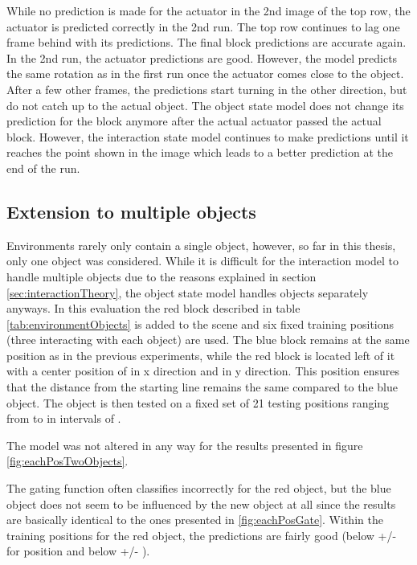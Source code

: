 While no prediction is made for the actuator in the 2nd image of the top row, the actuator is predicted correctly in the 2nd run. The top row continues to lag one frame behind with its predictions. The final block predictions are accurate again.
In the 2nd run, the actuator predictions are good. However, the model predicts the same rotation as in the first run once the actuator comes close to the object. After a few other frames, the predictions start turning in the other direction, but do not catch up to the actual object. The object state model does not change its prediction for the block anymore after the actual actuator passed the actual block. However, the interaction state model continues to make predictions until it reaches the point shown in the image which leads to a better prediction at the end of the run.

\subsection{Extension to multiple objects \label{sec:multipleObjects}}

Environments rarely only contain a single object, however, so far in this thesis, only one object was considered. While it is difficult for the interaction model to handle multiple objects due to the reasons explained in section \ref{sec:interactionTheory}, the object state model handles objects separately anyways. In this evaluation the red block described in table \ref{tab:environmentObjects} is added to the scene and six fixed training positions (three interacting with each object) are used. The blue block remains at the same position as in the previous experiments, while the red block is located left of it with a center position of  in x direction and  in y direction. This position ensures that the distance from the starting line remains the same compared to the blue object.
The object is then tested on a fixed set of 21 testing positions ranging from  to  in intervals of .


The model was not altered in any way for the results presented in figure \ref{fig:eachPosTwoObjects}.

The gating function often classifies incorrectly for the red object, but the blue object does not seem to be influenced by the new object at all since the results are basically identical to the ones presented in \ref{fig:eachPosGate}. 
Within the training positions for the red object, the predictions are fairly good (below  +/-  for position and below  +/- ).


